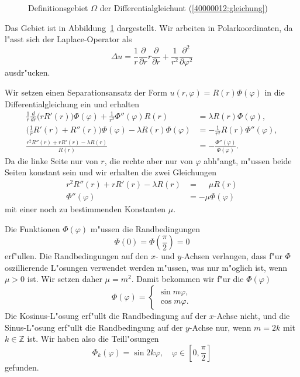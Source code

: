 \begin{loesung}
\begin{figure}
\centering
{}
\caption{Definitionsgebiet $\Omega$ der Differentialgleichunt
(\ref{40000012:gleichung})
\label{40000012:gebiet}
}
\end{figure}
Das Gebiet ist in Abbildung~\ref{40000012:gebiet} dargestellt.
Wir arbeiten in Polarkoordinaten, da l"asst sich der Laplace-Operator als
\[
\Delta u
=
\frac1r\frac{\partial}{\partial r}r\frac{\partial}{\partial r}
+
\frac1{r^2}
\frac{\partial^2}{\partial\varphi^2}
\]
ausdr"ucken.
\begin{teilaufgaben}
\item
Wir setzen einen Separationsansatz der Form $u(r,\varphi)=R(r)\Phi(\varphi)$
in die Differentialgleichung ein und erhalten
\begin{align*}
\frac1r\frac{d}{dr}\bigl(rR'(r)\bigr)\Phi(\varphi)
+
\frac1{r^2}
\Phi''(\varphi)R(r)
&=
\lambda R(r)\Phi(\varphi),
\\
\biggl(\frac1rR'(r)+R''(r)\biggr)\Phi(\varphi)
- \lambda R(r)\Phi(\varphi)
&=
-
\frac1{r^2}
R(r)\Phi''(\varphi),
\\
\frac{r^2R''(r)+rR'(r)-\lambda R(r)}{R(r)}
&=
-\frac{\Phi''(\varphi)}{\Phi(\varphi)}.
\end{align*}
Da die linke Seite nur von $r$, die rechte aber nur von $\varphi$ abh"angt,
m"ussen beide Seiten konstant sein und wir
erhalten die zwei Gleichungen
\begin{align}
r^2R''(r)+rR'(r)-\lambda R(r)&=\phantom{-}\mu R(r)
\label{40000012:erste}
\\
\Phi''(\varphi)&=-\mu\Phi(\varphi)
\label{40000012:zweite}
\end{align}
mit einer noch zu bestimmenden Konstanten $\mu$.
\item
Die Funktionen $\Phi(\varphi)$ m"ussen die Randbedingungen
\[
\Phi(0)=\Phi({\textstyle\frac{\pi}2})=0
\]
erf"ullen.
Die Randbedingungen auf den $x$- und $y$-Achsen verlangen, dass f"ur $\Phi$
oszillierende L"osungen verwendet werden m"ussen, was nur m"oglich ist,
wenn $\mu>0$ ist. Wir setzen daher $\mu=m^2$. Damit bekommen wir f"ur die
$\Phi(\varphi)$
\[
\Phi(\varphi)=\begin{cases}\sin m\varphi,\\\cos m\varphi.\end{cases}
\]
Die Kosinus-L"osung erf"ullt die Randbedingung auf der $x$-Achse nicht,
und die Sinus-L"osung erf"ullt die Randbedingung auf der $y$-Achse nur,
wenn $m=2k$ mit $k\in\mathbb Z$ ist.
Wir haben also die Teill"osungen
\[
\Phi_k(\varphi)=\sin 2k\varphi, \quad\varphi\in[0,{\textstyle \frac{\pi}2}]
\]
gefunden.


\end{teilaufgaben}
\end{loesung}
